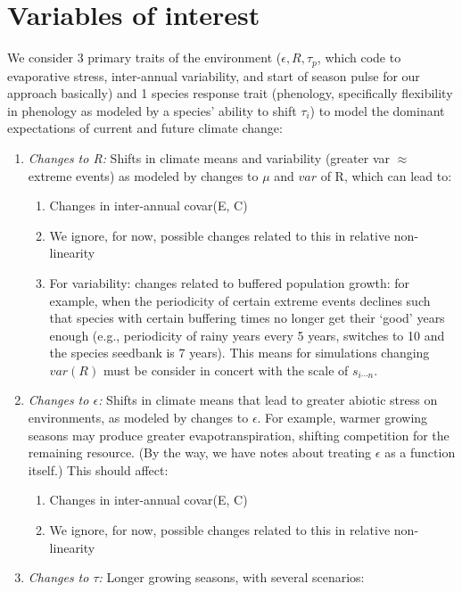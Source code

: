 \documentclass[11pt,a4paper,oneside]{article}
\begin{document}
\section{Variables of interest}
We consider 3 primary traits of the environment (\(\epsilon, R, \tau_{p}\), which
code to evaporative stress, inter-annual variability, and start of season pulse for our approach basically) and 1
species response trait (phenology, specifically flexibility in
phenology as modeled by a species' ability to shift \(\tau_{i}\)) to model
the dominant expectations of current and future climate change:
\begin{enumerate}
\item \emph{Changes to R:} Shifts in climate means and variability (greater var \(\approx\)
  extreme events) as modeled by changes to \(\mu\) and \(var\) of
    R,
  which can lead to:
\begin{enumerate}
\item Changes in inter-annual covar(E, C)
\item We ignore, for now, possible changes related to this in relative non-linearity
\item For variability: changes related to buffered population growth:
  for example, when the periodicity of certain extreme events declines
  such that species with certain buffering times no longer get their
  `good' years enough (e.g., periodicity of rainy years every 5 years,
  switches to 10 and the species seedbank is 7 years). This means for
  simulations changing \(var(R)\) must be consider in concert with the
  scale of \(s_{i\cdots n}\).
\end{enumerate}
\item \emph{Changes to \(\epsilon\):} Shifts in climate means that lead to greater abiotic stress on
  environments, as modeled by changes to  \(\epsilon\). For example,
  warmer growing seasons may produce greater evapotranspiration,
  shifting competition for the remaining resource. (By the way, we
  have notes about treating \(\epsilon\) as a function itself.) This should
  affect:
\begin{enumerate}
\item Changes in inter-annual covar(E, C)
\item We ignore, for now, possible changes related to this in relative non-linearity
\end{enumerate}
\item \emph{Changes to \(\tau\):} Longer growing seasons, with several scenarios:
\begin{enumerate}

\end{enumerate}
\end{enumerate}
\end{document}
